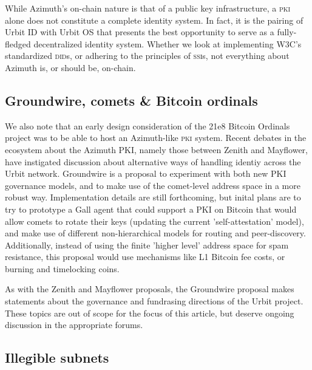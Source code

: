 \documentclass[twoside]{article}
\begin{document}
While Azimuth's on-chain nature is that of a public key infrastructure, a \textsc{pki} alone does not constitute a complete identity system. In fact, it is the pairing of Urbit ID with Urbit OS that presents the best opportunity to serve as a fully-fledged decentralized identity system. Whether we look at implementing W3C's standardized \textsc{did}s, or adhering to the principles of \textsc{ssi}s, not everything about Azimuth is, or should be, on-chain.

\subsection{Groundwire, comets & Bitcoin ordinals}

We also note that an early design consideration of the 21e8 Bitcoin Ordinals project was to be able to host an Azimuth-like \textsc{pki} system. Recent debates in the ecosystem about the Azimuth PKI, namely those between Zenith and Mayflower, have instigated discussion about alternative ways of handling identiy across the Urbit network. Groundwire is a proposal to experiment with both new PKI governance models, and to make use of the comet-level address space in a more robust way. Implementation details are still forthcoming, but inital plans are to try to prototype a Gall agent that could support a PKI on Bitcoin that would allow comets to rotate their keys (updating the current 'self-attestation' model), and make use of different non-hierarchical models for routing and peer-discovery. Additionally, instead of using the finite 'higher level' address space for spam resistance, this proposal would use mechanisms like L1 Bitcoin fee costs, or burning and timelocking coins.

As with the Zenith and Mayflower proposals, the Groundwire proposal makes statements about the governance and fundrasing directions of the Urbit project. These topics are out of scope for the focus of this article, but deserve ongoing discussion in the appropriate forums.

\subsection{Illegible subnets}
\end{document}
